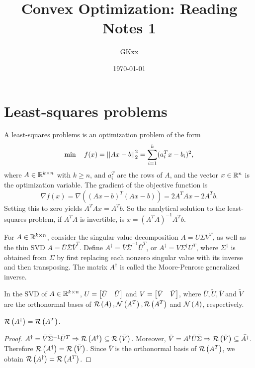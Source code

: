\documentclass[12pt]{article}
\title{Convex Optimization: Reading Notes 1}
\author{GKxx}
\date{\today}
\begin{document}
\maketitle

\section{Least-squares problems}

A least-squares problems is an optimization problem of the form
\[\min\quad f(x)=\left|\left|Ax-b\right|\right|_2^2=\sum_{i=1}^k(a_i^Tx-b_i)^2,\]
where \(A\in\mathbb R^{k\times n}\) with \(k\geqslant n\), and \(a_i^T\) are the rows of \(A\), and the vector \(x\in\mathbb R^n\) is the optimization variable. The gradient of the objective function is
\[\nabla f(x)=\nabla\left((Ax-b)^T(Ax-b)\right)=2A^TAx-2A^Tb.\]
Setting this to zero yields \(A^TAx=A^Tb\). So the analytical solution to the least-squares problem, if \(A^TA\) is invertible, is \(x=(A^TA)^{-1}A^Tb\).

\begin{definition}
    For \(A\in\mathbb R^{k\times n}\), consider the singular value decomposition \(A=U\Sigma V^T\), as well as the thin SVD \(A=\bar U\bar\Sigma\bar V^T\). Define \(A^\dagger=\bar V\bar\Sigma^{-1}\bar U^T\), or \(A^\dagger=V\Sigma^\dagger U^T\), where \(\Sigma^\dagger\) is obtained from \(\Sigma\) by first replacing each nonzero singular value with its inverse and then transposing. The matrix \(A^\dagger\) is called the \textnormal{Moore-Penrose generalized inverse}.
\end{definition}

\begin{remark}
    In the SVD of \(A\in\mathbb R^{k\times n}\), \(U=\begin{bmatrix}\bar U & \tilde U\end{bmatrix}\) and \(V=\begin{bmatrix}\bar V & \tilde V\end{bmatrix}\), where \(\bar U,\tilde U,\bar V\) and \(\tilde V\) are the orthonormal bases of \(\mathcal R\left(A\right),\mathcal N\left(A^T\right),\mathcal R\left(A^T\right)\) and \(\mathcal N\left(A\right)\), respectively.
\end{remark}

\begin{lemma}
    \(\mathcal R\left(A^\dagger\right)=\mathcal R\left(A^T\right)\).
\end{lemma}
\begin{proof}
    \(A^\dagger=\bar V\bar\Sigma^{-1}\bar U^T\Rightarrow\mathcal R\left(A^\dagger\right)\subseteq\mathcal R\left(\bar V\right)\). Moreover, \(\bar V=A^\dagger\bar U\bar\Sigma\Rightarrow\mathcal R\left(\bar V\right)\subseteq\bar{A^\dagger}\). Therefore \(\mathcal R\left(A^\dagger\right)=\mathcal R\left(\bar V\right)\). Since \(\bar V\) is the orthonormal basis of \(\mathcal R\left(A^T\right)\), we obtain \(\mathcal R\left(A^\dagger\right)=\mathcal R\left(A^T\right)\).
\end{proof}
\end{document}

